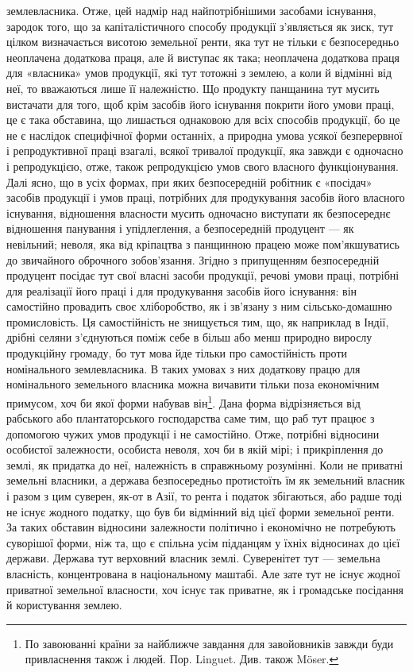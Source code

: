 \parcont{}  %
землевласника. Отже, цей надмір над найпотрібнішими засобами існування, зародок
того, що за капіталістичного способу продукції з’являється як зиск,
тут цілком визначається висотою земельної ренти, яка тут не тільки
є безпосередньо неоплачена додаткова праця, але й виступає як така; неоплачена
додаткова праця для «власника» умов продукції, які тут тотожні з землею, а коли
й відмінні від неї, то вважаються лише її належністю. Що продукту панщанина тут
мусить вистачати для того, щоб крім засобів його існування покрити його умови
праці, це є така обставина, що лишається однаковою для всіх способів продукції,
бо це не є наслідок специфічної форми останніх, а природна умова усякої безперервної
і репродуктивної праці взагалі, всякої тривалої продукції, яка завжди
є одночасно і репродукцією, отже, також репродукцією умов свого власного функціонування.
Далі ясно, що в усіх формах, при яких безпосередній робітник є
«посідач» засобів продукції і умов праці, потрібних для продукування засобів
його власного існування, відношення власности мусить одночасно виступати
як безпосереднє відношення панування і упідлеглення, а безпосередній
продуцент — як невільний; неволя, яка від кріпацтва з панщинною працею
може пом’якшуватись до звичайного оброчного зобов’язання. Згідно з припущенням
безпосередній продуцент посідає тут свої власні засоби продукції,
речові умови праці, потрібні для реалізації його праці і для продукування
засобів його існування: він самостійно провадить своє хліборобство, як і
зв’язану з ним сільсько-домашню промисловість. Ця самостійність не знищується
тим, що, як наприклад в Індії, дрібні селяни з’єднуються поміж себе в
більш або менш природно вирослу продукційну громаду, бо тут мова йде тільки
про самостійність проти номінального землевласника. В таких умовах з них
додаткову працю для номінального земельного власника можна вичавити
тільки поза економічним примусом, хоч би якої форми набував він\footnote{
По завоюванні країни за найближче завдання для завойовників завжди буди привласнення також і
людей. Пор. Linguet. Див. також Möser.
}. Дана форма
відрізняється від рабського або плантаторського господарства саме тим, що раб
тут працює з допомогою чужих умов продукції і не самостійно. Отже, потрібні
відносини особистої залежности, особиста неволя, хоч би в якій мірі; і прикріплення
до землі, як придатка до неї, належність в справжньому розумінні.
Коли не приватні земельні власники, а держава безпосередньо протистоїть їм
як земельний власник і разом з цим суверен, як-от в Азії, то рента і податок
збігаються, або радше тоді не існує жодного податку, що був би відмінний від цієї
форми земельної ренти. За таких обставин відносини залежности політично і
економічно не потребують суворішої форми, ніж та, що є спільна усім підданцям
у їхніх відносинах до цієї держави. Держава тут верховний власник землі.
Суверенітет тут — земельна власність, концентрована в національному маштабі.
Але зате тут не існує жодної приватної земельної власности, хоч існує так
приватне, як і громадське посідання й користування землею.

